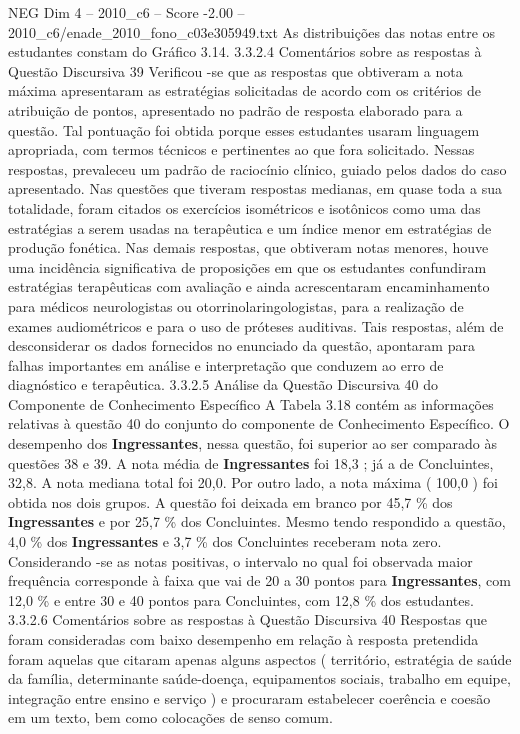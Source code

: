 \begin{textsample}{NEG Dim 4 – 2010\_c6 – Score -2.00 – 2010\_c6/enade\_2010\_fono\_c03e305949.txt}
As distribuições das notas entre os estudantes constam do Gráfico 3.14. 3.3.2.4 Comentários sobre as respostas à Questão Discursiva 39 Verificou -se que as respostas que obtiveram a nota máxima apresentaram as estratégias solicitadas de acordo com os critérios de atribuição de pontos, apresentado no padrão de resposta elaborado para a questão.
Tal pontuação foi obtida porque esses estudantes usaram linguagem apropriada, com termos técnicos e pertinentes ao que fora solicitado.
Nessas respostas, prevaleceu um padrão de raciocínio clínico, guiado pelos dados do caso apresentado.
Nas questões que tiveram respostas medianas, em quase toda a sua totalidade, foram citados os exercícios isométricos e isotônicos como uma das estratégias a serem usadas na terapêutica e um índice menor em estratégias de produção fonética.
Nas demais respostas, que obtiveram notas menores, houve uma incidência significativa de proposições em que os estudantes confundiram estratégias terapêuticas com avaliação e ainda acrescentaram encaminhamento para médicos neurologistas ou otorrinolaringologistas, para a realização de exames audiométricos e para o uso de próteses auditivas.
Tais respostas, além de desconsiderar os dados fornecidos no enunciado da questão, apontaram para falhas importantes em análise e interpretação que conduzem ao erro de diagnóstico e terapêutica. 3.3.2.5 Análise da Questão Discursiva 40 do Componente de Conhecimento Específico A Tabela 3.18 contém as informações relativas à questão 40 do conjunto do componente de Conhecimento Específico.
O desempenho dos \textbf{Ingressantes}, nessa questão, foi superior ao ser comparado às questões 38 e 39.
A nota média de \textbf{Ingressantes} foi 18,3 ; já a de Concluintes, 32,8.
A nota mediana total foi 20,0.
Por outro lado, a nota máxima ( 100,0 ) foi obtida nos dois grupos.
A questão foi deixada em branco por 45,7 \% dos \textbf{Ingressantes} e por 25,7 \% dos Concluintes.
Mesmo tendo respondido a questão, 4,0 \% dos \textbf{Ingressantes} e 3,7 \% dos Concluintes receberam nota zero.
Considerando -se as notas positivas, o intervalo no qual foi observada maior frequência corresponde à faixa que vai de 20 a 30 pontos para \textbf{Ingressantes}, com 12,0 \% e entre 30 e 40 pontos para Concluintes, com 12,8 \% dos estudantes. 3.3.2.6 Comentários sobre as respostas à Questão Discursiva 40 Respostas que foram consideradas com baixo desempenho em relação à resposta pretendida foram aquelas que citaram apenas alguns aspectos ( território, estratégia de saúde da família, determinante saúde-doença, equipamentos sociais, trabalho em equipe, integração entre ensino e serviço ) e procuraram estabelecer coerência e coesão em um texto, bem como colocações de senso comum.

\end{textsample}
